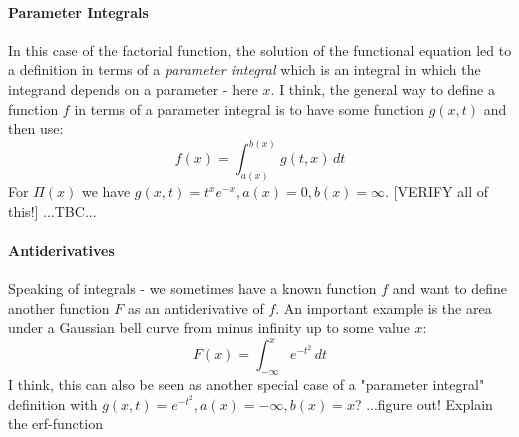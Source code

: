 
\paragraph{Parameter Integrals}
In this case of the factorial function, the solution of the functional equation led to a definition in terms of a \emph{parameter integral} which is an integral in which the integrand depends on a parameter - here $x$.
I think, the general way to define a function $f$ in terms of a parameter integral is to have some function $g(x,t)$ and then use:
\begin{equation}
 f(x)  = \int_{a(x)}^{b(x)} g(t,x) \, dt
\end{equation}
For $\Pi(x)$ we have $g(x,t) = t^x e^{-x}, a(x) = 0, b(x) = \infty$.
[VERIFY all of this!]
...TBC...

\paragraph{Antiderivatives}
Speaking of integrals - we sometimes have a known function $f$ and want to define another function $F$ as an antiderivative of $f$. An important example is the area under a Gaussian bell curve from minus infinity up to some value $x$:
\begin{equation}
 F(x)  = \int_{-\infty}^{x} e^{-t^2}  \, dt
\end{equation}
I think, this can also be seen as another special case of a "parameter integral" definition with $g(x,t)=e^{-t^2}, a(x)= -\infty, b(x)=x$? ...figure out! Explain the erf-function

